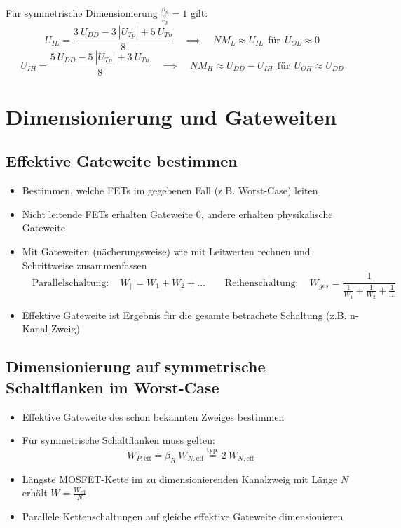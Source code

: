 \documentclass[a4paper,11pt]{article}
\begin{document}
Für symmetrische Dimensionierung $\frac{\beta_n}{\beta_p} = 1$ gilt:
\[
	U_{IL} = \frac{3 ~ U_{DD} - 3 ~ |U_{Tp}| + 5 ~ U_{Tn}}{8} \quad \implies \quad NM_L \approx U_{IL} ~~ \text{für} ~~ U_{OL} \approx 0
\]
\[
	U_{IH} = \frac{5 ~ U_{DD} - 5 ~ |U_{Tp}| + 3 ~ U_{Tn}}{8} \quad \implies \quad NM_H \approx U_{DD} - U_{IH} ~~ \text{für} ~~ U_{OH} \approx U_{DD}
\]

\section*{Dimensionierung und Gateweiten}
\subsection*{Effektive Gateweite bestimmen}
\begin{itemize}
	\item Bestimmen, welche FETs im gegebenen Fall (z.B. Worst-Case) leiten
	\item Nicht leitende FETs erhalten Gateweite 0, andere erhalten physikalische Gateweite
	\item Mit Gateweiten (nächerungsweise) wie mit Leitwerten rechnen und Schrittweise zusammenfassen
	\[
		\boxed{\quad \mathrm{Parallelschaltung:} \quad W_{\parallel} = W_1 + W_2 + \ldots \qquad \mathrm{Reihenschaltung:} \quad W_{ges} = \frac{1}{\frac{1}{W_1} + \frac{1}{W_2} + \frac{1}{\ldots}} \quad}
	\]
	\item Effektive Gateweite ist Ergebnis für die gesamte betrachete Schaltung (z.B. n-Kanal-Zweig)
\end{itemize}

\subsection*{Dimensionierung auf symmetrische Schaltflanken im Worst-Case}
\begin{itemize}
\item Effektive Gateweite des schon bekannten Zweiges bestimmen
\item Für symmetrische Schaltflanken muss gelten:
\[
\boxed{\quad W_{P, \mathrm{eff}} \overset{!}{=} \beta_R ~ W_{N, \mathrm{eff}} \overset{\mathrm{typ}.}{=} 2 ~ W_{N, \mathrm{eff}} \quad}
\]
\item Längste MOSFET-Kette im zu dimensionierenden Kanalzweig mit Länge $N$ erhält $W = \frac{W_{\mathrm{eff}}}{N}$
\item Parallele Kettenschaltungen auf gleiche effektive Gateweite dimensionieren
\end{itemize}
\end{document}
